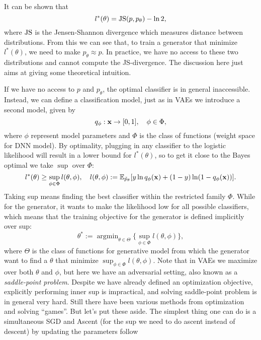 \documentclass[../main.tex]{subfiles}
\begin{document}
It can be shown that
\begin{equation*}
l^*(\theta)={\rm JS}(p,p_\theta)-\ln 2,
\end{equation*}
where ${\rm JS}$ is the Jensen-Shannon divergence which measures distance between distributions. From this we can see that, to train a generator that minimize $l^*(\theta)$, we need to make $p_\theta \approx p$. In practice, we have no access to these two distributions and cannot compute the JS-divergence. The discussion here just aims at giving some theoretical intuition.
\par If we have no access to $p$ and $p_\theta$, the optimal classifier is in general inaccessible. Instead, we can define a classification model, just as in VAEs we introduce a second model, given by
\begin{equation*}
q_\phi:{\bf x}\rightarrow [0,1],\quad \phi\in\Phi,
\end{equation*}
where $\phi$ represent model parameters and $\Phi$ is the class of functions (weight space for DNN model). By optimality, plugging in any classifier to the logistic likelihood will result in a lower bound for $l^*(\theta)$, so to get it close to the Bayes optimal we take $\sup$ over $\Phi$:
\begin{equation*}
l^*(\theta)\geq\sup_{\phi\in\Phi}l(\theta,\phi),\quad l(\theta,\phi) :=\mathbb{E}_{\tilde{p}_\theta}[y\ln q_\phi({\bf x})+(1-y)\ln(1-q_\phi({\bf x}))].
\end{equation*}
Taking sup means finding the best classifier within the restricted family ${\Phi}$. While for the generator, it wants to make the likelihood low for all possible classifiers, which means that the training objective for the generator is defined implicitly over sup:
\begin{equation*}
\theta^*:=\mathop{\arg\min}_{\theta\in\Theta}\{\sup_{\phi\in\Phi}l(\theta,\phi)\},
\end{equation*}
where ${\Theta}$ is the class of functions for generative model from which the generator want to find a ${\theta}$ that minimize $\sup_{\phi\in\Phi}l(\theta,\phi)$. Note that in VAEs we maximize over both $\theta$ and $\phi$, but here we have an adversarial setting, also known as a \emph{saddle-point problem}. Despite we have already defined an optimization objective, explicitly performing inner sup is impractical, and solving saddle-point problem is in general very hard. Still there have been various methods from optimization and solving ``games''. But let's put these aside. The simplest thing one can do is a simultaneous SGD and Ascent (for the sup we need to do ascent instead of descent) by updating the parameters follow
\end{document}
